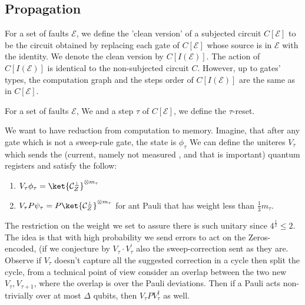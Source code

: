
\subsection{Propagation}

\begin{definition}
For a set of faults $\mathcal{E}$, we define the 'clean version' of a subjected circuit $C[\mathcal{E}]$ to be the circuit obtained by replacing each gate of $C[\mathcal{E}]$ whose source is in $\mathcal{E}$ with the identity. We denote the clean version by $C[I(\mathcal{E})]$. The action of $C[I(\mathcal{E})]$ is identical to the non-subjected circuit $C$. However, up to gates' types, the computation graph and the steps order of $C[I(\mathcal{E})]$ are the same as in $C[\mathcal{E}]$.
\end{definition}

\begin{definition}
  For a set of faults $\mathcal{E}$, We and a step $\tau$ of $C[\mathcal{E}]$, we define the $\tau$-reset. 
\end{definition}





We want to have reduction from computation to memory. Imagine, that after any gate which is not a sweep-rule gate, the state is $\phi_{\tau}$  We can define the uniteres  $V_{\tau}$ which sends the (current, namely not measured , and that is important) quantum registers and satisfy the follow: 
\begin{enumerate}
  \item $V_{\tau} \phi_{\tau} = \ket{\mathcal{C}_{Z}^{\perp}}^{\otimes m_{\tau}}$ 
  \item $V_{\tau} P \psi_{\tau} =  P \ket{\mathcal{C}_{Z}^{\perp}}^{\otimes m_{\tau}}$ for ant Pauli that has weight less than $\frac{1}{3}m_{\tau}$. 
\end{enumerate}
The restriction on the weight we set to assure there is such unitary since $4^{\frac{1}{2}} \le 2$. The idea is that with high probability we send errors to act on the Zeros-encoded, (if we conjecture by $V_{\tau} \cdot V_{\tau}^{\prime}$ also the sweep-correction sent as they are. Observe if $V_{\tau}$ doesn't capture all the suggested correction in a cycle then split the cycle, from a technical point of view consider an overlap between the two new $V_{\tau}, V_{\tau+1}$, where the overlap is over the Pauli deviations. Then if a Pauli acts non-trivially over at most $\Delta$ qubits, then $V_{\tau} P V_{\tau}^{\dagger}$ as well.

